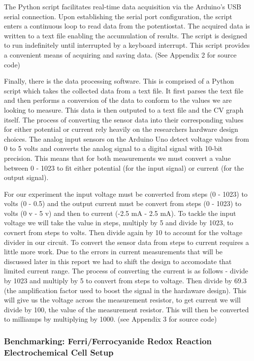 \documentclass{article}
\begin{document}
The Python script facilitates real-time data acquisition via the Arduino's USB serial connection. Upon establishing the serial port configuration, the script enters a continuous loop to read data from the potentiostat. The acquired data is written to a text file enabling the accumulation of results. The script is designed to run indefinitely until interrupted by a keyboard interrupt. This script provides a convenient means of acquiring and saving data. (See Appendix 2 for source code)

Finally, there is the data processing software. This is comprised of a Python script which takes the collected data from a text file. It first parses the text file and then performs a conversion of the data to conform to the values we are looking to measure. This data is then outputed to a text file and the CV graph itself. The process of converting the sensor data into their corresponding values for either potential or current rely heavily on the researchers hardware design choices. The analog input sensors on the Arduino Uno detect voltage values from 0 to 5 volts and converts the analog signal to a digital signal with 10-bit precision. This means that for both measurements we must convert a value between 0 - 1023 to fit either potential (for the input signal) or current (for the output signal). 

For our experiment the input voltage must be converted from steps (0 - 1023) to volts (0 - 0.5) and the output current must be convert from steps (0 - 1023) to volts (0 v - 5 v) and then to current (-2.5 mA - 2.5 mA). To tackle the input voltage we will take the value in steps, multiply by 5 and divide by 1023, to covnert from steps to volts. Then divide again by 10 to account for the voltage divider in our circuit. To convert the sensor data from steps to current requires a little more work. Due to the errors in current measurements that will be discussed later in this report we had to shift the design to accomodate that limited current range. The process of converting the current is as follows - divide by 1023 and multiply by 5 to convert from steps to voltage. Then divide by 69.3 (the amplification factor used to boost the signal in the hardaware design). This will give us the voltage across the measurement resistor, to get current we will divide by 100, the value of the measurement resistor. This will then be converted to milliamps by multiplying by 1000. (see Appendix 3 for source code) 



\subsubsection*{Benchmarking: Ferri/Ferrocyanide Redox Reaction Electrochemical Cell Setup}
\end{document}
